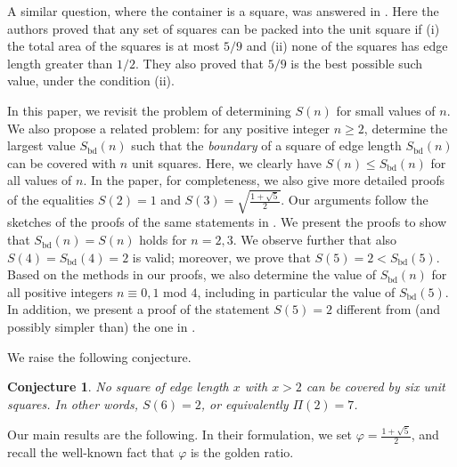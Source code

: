 \documentclass[twoside]{amsart}
\newtheorem{conjecture}[theorem]{Conjecture}
\DeclareMathOperator{\bd}{bd}
\begin{document}
A similar question, where the container is a square, was answered in
\cite{Buchwald16}. Here the authors proved that any set of squares can be packed
into the unit square if (i) the total area of the squares is at most $5/9$ and
(ii) none of the squares has edge length greater than $1/2$. They also proved
that $5/9$ is the best possible such value, under the condition (ii).


In this paper, we revisit the problem of determining $S(n)$ for small values of $n$. We also propose a related problem: for any positive integer $n \geq 2$, determine
the largest value $S_{\bd}(n)$ such that the \emph{boundary} of a square of edge length $S_{\bd}(n)$ can be covered with $n$ unit squares. Here, we clearly have $S(n) \leq S_{\bd}(n)$ for all values of $n$. In the paper, for completeness, we also give more detailed proofs of the equalities $S(2)=1$ and $S(3) = \sqrt{\frac{1+\sqrt{5}}{2}}$. Our arguments follow the sketches of the proofs of the same statements in \cite{Friedcov}. We present the proofs to show that $S_{\bd}(n)=S(n)$ holds for $n=2,3$. We observe further that also $S(4)=S_{\bd}(4)=2$ is valid; moreover, we prove that $S(5)=2 < S_{\bd}(5)$. Based on the methods in our proofs, we also determine the value of $S_{\bd}(n)$ for all positive integers $n \equiv 0,1$ mod $4$, including in particular the value of $S_{\bd}(5)$. In addition, we present a proof of the statement $S(5)=2$ different from (and possibly simpler than) the one in \cite{Janu09}.

We raise the following conjecture.


\begin{conjecture}
No square of edge length $x$ with $x > 2$ can be covered by six unit squares. In other words, $S(6)=2$, or equivalently $\Pi(2)=7$.
\end{conjecture}

Our main results are the following. In their formulation, we set $\varphi= \frac{1+\sqrt{5}}{2}$, and recall the well-known fact that $\varphi$ is the golden ratio.

\end{document}
